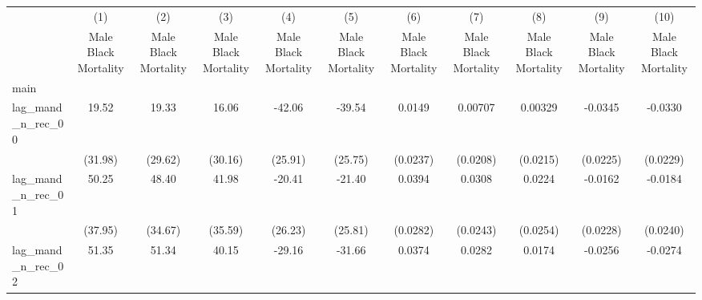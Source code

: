 {
\def\sym#1{\ifmmode^{#1}\else\(^{#1}\)\fi}
\begin{longtable}{l*{10}{c}}
\hline\hline\endfirsthead\hline\endhead\hline\endfoot\endlastfoot
                    &\multicolumn{1}{c}{(1)}&\multicolumn{1}{c}{(2)}&\multicolumn{1}{c}{(3)}&\multicolumn{1}{c}{(4)}&\multicolumn{1}{c}{(5)}&\multicolumn{1}{c}{(6)}&\multicolumn{1}{c}{(7)}&\multicolumn{1}{c}{(8)}&\multicolumn{1}{c}{(9)}&\multicolumn{1}{c}{(10)}\\
                    &\multicolumn{1}{c}{Male Black Mortality}&\multicolumn{1}{c}{Male Black Mortality}&\multicolumn{1}{c}{Male Black Mortality}&\multicolumn{1}{c}{Male Black Mortality}&\multicolumn{1}{c}{Male Black Mortality}&\multicolumn{1}{c}{Male Black Mortality}&\multicolumn{1}{c}{Male Black Mortality}&\multicolumn{1}{c}{Male Black Mortality}&\multicolumn{1}{c}{Male Black Mortality}&\multicolumn{1}{c}{Male Black Mortality}\\
\hline
main                &                     &                     &                     &                     &                     &                     &                     &                     &                     &                     \\
lag\_mand\_n\_rec\_00   &       19.52         &       19.33         &       16.06         &      -42.06         &      -39.54         &      0.0149         &     0.00707         &     0.00329         &     -0.0345         &     -0.0330         \\
                    &     (31.98)         &     (29.62)         &     (30.16)         &     (25.91)         &     (25.75)         &    (0.0237)         &    (0.0208)         &    (0.0215)         &    (0.0225)         &    (0.0229)         \\
[1em]
lag\_mand\_n\_rec\_01   &       50.25         &       48.40         &       41.98         &      -20.41         &      -21.40         &      0.0394         &      0.0308         &      0.0224         &     -0.0162         &     -0.0184         \\
                    &     (37.95)         &     (34.67)         &     (35.59)         &     (26.23)         &     (25.81)         &    (0.0282)         &    (0.0243)         &    (0.0254)         &    (0.0228)         &    (0.0240)         \\
[1em]
lag\_mand\_n\_rec\_02   &       51.35         &       51.34         &       40.15         &      -29.16         &      -31.66         &      0.0374         &      0.0282         &      0.0174         &     -0.0256         &     -0.0274         \\

\end{longtable}}
